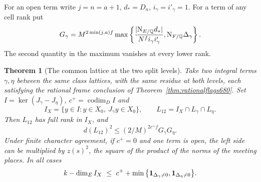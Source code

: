 \documentclass[a4paper,11pt]{article}
\newtheorem{theorem}[proposition]{Theorem}
\theoremstyle{definition}
\theoremstyle{remark}
\numberwithin{equation}{section}
\begin{document}
For an open term write \(j=n=a+1\), \(d_*=D_n\),
\(i_\gamma=i'_\gamma=1\). For a term of any cell rank put
\[
  G_\gamma=M^{2\min(j,a)f}
       \max\left\{
       \frac{|{\rm N}_{E/\mathbb Q}d_*|}
            {N^f i_\gamma i'_\gamma},
                     {\rm N}_{F/\mathbb Q}\Delta_\gamma\right\}.
\]
The second quantity in the maximum vanishes at every lower rank.

\begin{theorem}[The common lattice at the two split levels]
\leavevmode\label{thm:allpair689}
Take two integral terms \(\gamma,\eta\) between the same class
lattices, with the same residue at both levels, each satisfying
the rational frame conclusion of Theorem~\ref{thm:rationalflags680}.
Set \(I=\ker(J_\gamma-J_\eta)\), \(c^+=\operatorname{codim}_D I\)
and
\[
 I_X=\{y\in I:y\in X_0,\ J_\gamma y\in X_0\},\qquad
 L_{12}=I_X\cap L_\gamma\cap L_\eta .
\]
Then \(L_{12}\) has full rank in \(I_X\), and
\[
             d(L_{12})^2\le(2/M)^{2c^+ f}G_\gamma G_\eta .
\]
Under finite character agreement, if \(c^+=0\) and one term
is open, the left side can be multiplied by \(z(s)^2\), the
square of the product of the norms of the meeting places.
In all cases
\[
 k-\dim_E I_X\ \le\ c^++\min\big\{
       {\bf1}_{\Delta_\gamma\ne0},{\bf1}_{\Delta_\eta\ne0}\big\}.
\]
\end{theorem}
\end{document}
